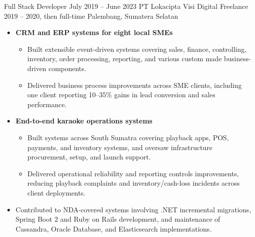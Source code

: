 \begin{jobentry}
	\role
	{Full Stack Developer}
	{July 2019 -- June 2023}
	{PT Lokacipta Visi Digital}
	{Freelance 2019 -- 2020, then full-time}
	{Palembang, Sumatera Selatan}
	\begin{itemize}
		\item \textbf{CRM and ERP systems for eight local SMEs}
		\begin{itemize}
			\item Built extensible event-driven systems covering sales, finance, controlling, inventory, order processing, reporting, and various custom made business-driven components.
			\item Delivered business process improvements across SME clients, including one client reporting 10--35\% gains in lead conversion and sales performance.
		\end{itemize}
		\item \textbf{End-to-end karaoke operations systems}
		\begin{itemize}
			\item Built systems across South Sumatra covering playback apps, POS, payments, and inventory systems, and oversaw infrastructure procurement, setup, and launch support.
			\item Delivered operational reliability and reporting controls improvements, reducing playback complaints and inventory/cash-loss incidents across client deployments.
		\end{itemize}
		\item Contributed to NDA-covered systems involving .NET incremental migrations, Spring Boot 2 and Ruby on Rails development, and maintenance of Cassandra, Oracle Database, and Elasticsearch implementations.
	\end{itemize}
\end{jobentry}

